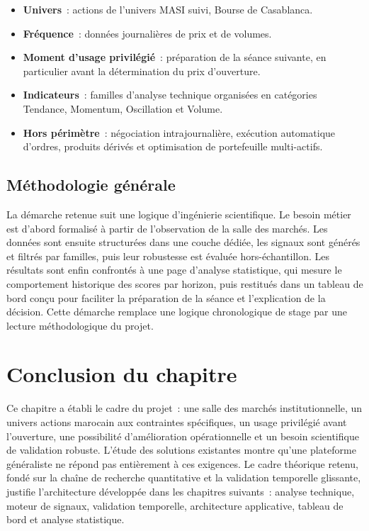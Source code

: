 \begin{itemize}
    \item \textbf{Univers}~: actions de l'univers MASI suivi, Bourse de Casablanca.
    \item \textbf{Fréquence}~: données journalières de prix et de volumes.
    \item \textbf{Moment d'usage privilégié}~: préparation de la séance suivante, en
    particulier avant la détermination du prix d'ouverture.
    \item \textbf{Indicateurs}~: familles d'analyse technique organisées en catégories
    Tendance, Momentum, Oscillation et Volume.
    \item \textbf{Hors périmètre}~: négociation intrajournalière, exécution automatique d'ordres,
    produits dérivés et optimisation de portefeuille multi-actifs.
\end{itemize}

\subsection{Méthodologie générale}

La démarche retenue suit une logique d'ingénierie scientifique. Le besoin métier est
d'abord formalisé à partir de l'observation de la salle des marchés. Les données sont ensuite structurées
dans une couche dédiée, les signaux sont générés et filtrés par familles, puis leur
robustesse est évaluée hors-échantillon. Les résultats sont enfin confrontés à une
page d'analyse statistique, qui mesure le comportement historique des scores par horizon,
puis restitués dans un tableau de bord conçu pour faciliter la préparation de la séance
et l'explication de la décision. Cette démarche remplace une logique chronologique de
stage par une lecture méthodologique du projet.

\section*{Conclusion du chapitre}

Ce chapitre a établi le cadre du projet~: une salle des marchés institutionnelle,
un univers actions marocain aux contraintes spécifiques, un usage privilégié avant
l'ouverture, une possibilité d'amélioration opérationnelle et un besoin scientifique de
validation robuste. L'étude des solutions existantes montre qu'une plateforme généraliste
ne répond pas entièrement à ces exigences. Le cadre théorique retenu, fondé sur la chaîne
de recherche quantitative et la validation temporelle glissante, justifie l'architecture
développée dans les chapitres suivants~: analyse technique, moteur de signaux, validation
temporelle, architecture applicative, tableau de bord et analyse statistique.
